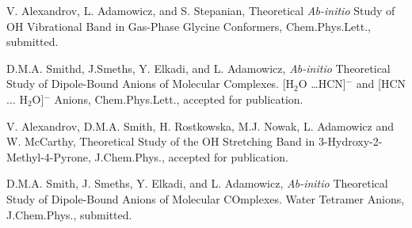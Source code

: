 \begin{thebibliography}{999}
V. Alexandrov, L. Adamowicz, and S. Stepanian,
Theoretical {\it Ab-initio} Study of OH Vibrational Band
in Gas-Phase Glycine Conformers, Chem.Phys.Lett.,
submitted.

D.M.A. Smithd, J.Smeths, Y. Elkadi, and L. Adamowicz,
{\it Ab-initio} Theoretical Study of Dipole-Bound Anions
of Molecular Complexes. [H$_2$O \dots HCN]$^-$ and
[HCN $\dots$ H$_2$O]$^-$ Anions,
Chem.Phys.Lett., accepted for publication.

V. Alexandrov, D.M.A. Smith, H. Rostkowska, M.J. Nowak, 
L. Adamowicz and W. McCarthy, 
Theoretical Study of the OH Stretching Band in 3-Hydroxy-2-Methyl-4-Pyrone,
J.Chem.Phys., accepted for publication.

D.M.A. Smith, J. Smeths, Y. Elkadi, and L. Adamowicz,
{\it Ab-initio} Theoretical Study of Dipole-Bound Anions
of Molecular COmplexes. Water Tetramer Anions,
J.Chem.Phys., submitted.







%


\end{thebibliography}
